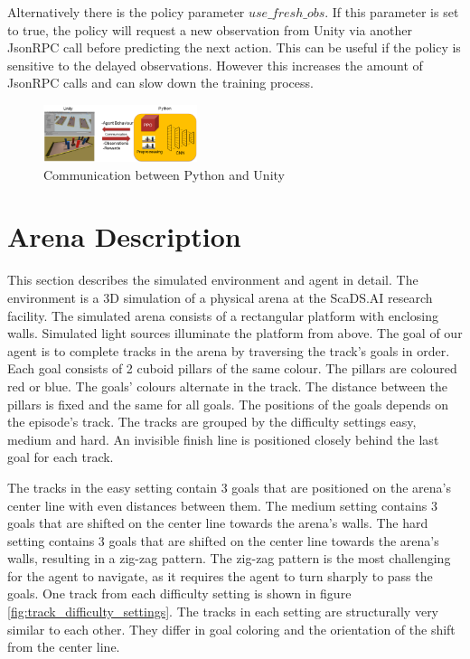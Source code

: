 Alternatively there is the policy parameter $use\_fresh\_obs$. If this parameter is set to true, the policy will request a new observation from Unity via another JsonRPC call before predicting the next action. This can be useful if the policy is sensitive to the delayed observations. However this increases the amount of JsonRPC calls and can slow down the training process.



\begin{figure}
    \centering
    \includegraphics[width=0.4\textwidth]{Bilder/unity_communication.png}
    \caption{Communication between Python and Unity}
    \label{fig:communication_python_unity}
\end{figure} %





\section{Arena Description}


This section describes the simulated environment and agent in detail. The environment is a 3D simulation of a physical arena at the ScaDS.AI research facility. The simulated arena consists of a rectangular platform with enclosing walls. Simulated light sources illuminate the platform from above.
The goal of our agent is to complete tracks in the arena by traversing the track's goals in order. Each goal consists of 2 cuboid pillars of the same colour. The pillars are coloured red or blue. The goals' colours alternate in the track. The distance between the pillars is fixed and the same for all goals. The positions of the goals depends on the episode's track. The tracks are grouped by the difficulty settings easy, medium and hard. An invisible finish line is positioned closely behind the last goal for each track.

The tracks in the easy setting contain 3 goals that are positioned on the arena's center line with even distances between them. The medium setting contains 3 goals that are shifted on the center line towards the arena's walls. The hard setting contains 3 goals that are shifted on the center line towards the arena's walls, resulting in a zig-zag pattern. The zig-zag pattern is the most challenging for the agent to navigate, as it requires the agent to turn sharply to pass the goals. One track from each difficulty setting is shown in figure \ref{fig:track_difficulty_settings}. The tracks in each setting are structurally very similar to each other. They differ in goal coloring and the orientation of the shift from the center line.


